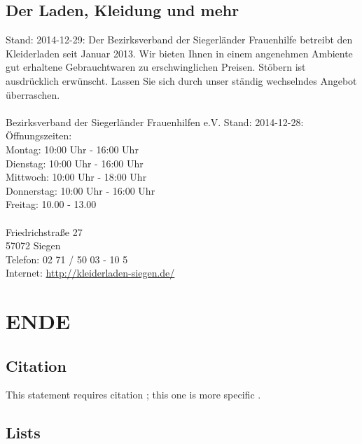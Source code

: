 \documentclass[11pt,fleqn]{book} %
\begin{document}
\section{Der Laden, Kleidung und mehr}
Stand: 2014-12-29: Der Bezirksverband der Siegerländer Frauenhilfe betreibt den Kleiderladen seit Januar 2013. Wir bieten Ihnen in einem angenehmen Ambiente gut erhaltene Gebrauchtwaren zu erschwinglichen Preisen. Stöbern ist ausdrücklich erwünscht. Lassen Sie sich durch unser ständig wechselndes Angebot überraschen.\\
\\
Bezirksverband der Siegerländer Frauenhilfen e.V. 
Stand: 2014-12-28: Öffnungszeiten: \\
Montag: 10:00 Uhr - 16:00 Uhr\\
Dienstag: 10:00 Uhr - 16:00 Uhr\\
Mittwoch: 10:00 Uhr - 18:00 Uhr\\
Donnerstag: 10:00 Uhr - 16:00 Uhr\\
Freitag: 10.00 - 13.00\\
\\
Friedrichstraße 27\\
57072 Siegen\\
Telefon: 02 71 / 50 03 - 10 5\\
Internet: \href{http://kleiderladen-siegen.de/}{http://kleiderladen-siegen.de/}


\chapter{ENDE}


\section{Citation}

This statement requires citation \cite{book_key}; this one is more specific \cite[122]{article_key}.


\section{Lists}
\end{document}

